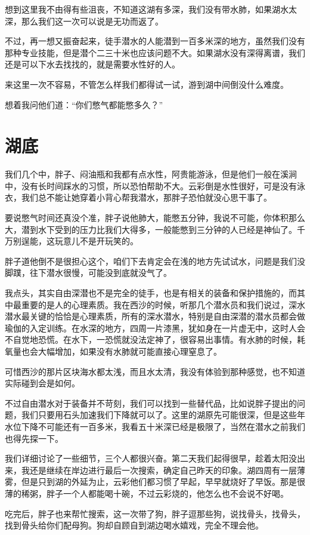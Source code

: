 想到这里我不由得有些沮丧，不知道这湖有多深，我们没有带水肺，如果湖水太深，那么我们这一次可以说是无功而返了。

不过，再一想又振奋起来，徒手潜水的人能潜到一百多米深的地方，虽然我们没有那种专业技能，但是潜个二三十米也应该问题不大。如果湖水没有深得离谱，我们还是可以下水去找找的，就是需要水性好的人。

来这里一次不容易，不管怎么样我们都得试一试，游到湖中间倒没什么难度。

想着我问他们道：“你们憋气都能憋多久？”

\chapter{湖底}

我们几个中，胖子、闷油瓶和我都有点水性，阿贵能游泳，但是他们一般在溪涧中，没有长时间踩水的习惯，所以恐怕帮助不大。云彩倒是水性很好，可是没有泳衣，我们总不能让她穿着小背心帮我潜水，那胖子恐怕就没心思干事了。

要说憋气时间还真没个准，胖子说他肺大，能憋五分钟，我说不可能，你体积那么大，潜到水下受到的压力比我们大得多，一般能憋到三分钟的人已经是神仙了。千万别逞能，这玩意儿不是开玩笑的。

胖子道他倒不是很担心这个，咱们下去肯定会在浅的地方先试试水，问题是我们没脚蹼，往下潜水很慢，可能没到底就没气了。

我点头，其实自由深潜也不是完全的徒手，也是有相关的装备和保护措施的，而其中最重要的是人的心理素质。我在西沙的时候，听那几个潜水员和我们说过，深水潜水最关键的恰恰是心理素质，所有的深水潜水，特别是自由深潜的潜水员都会做瑜伽的入定训练。在水深的地方，四周一片漆黑，犹如身在一片虚无中，这时人会不自觉地恐慌。在水下，一恐慌就没法定神了，很容易出事情。有水肺的时候，耗氧量也会大幅增加，如果没有水肺就可能直接心理窒息了。

可惜西沙的那片区块海水都太浅，而且水太清，我没有体验到那种感觉，也不知道实际碰到会是如何。

不过自由潜水对于装备并不苛刻，我们可以找到一些替代品，比如说胖子提出的问题，我们只要用石头加速我们下降就可以了。这里的湖原先可能很深，但是这些年水位下降不可能还有一百多米，我看五十米深已经是极限了，当然在潜水之前我们也得先探一下。

我们详细讨论了一些细节，三个人都很兴奋。第二天我们起得很早，趁着太阳没出来，我还是继续在岸边进行最后一次搜索，确定自己昨天的印象。湖四周有一层薄雾，但是只到湖的外延为止，云彩他们都习惯了早起，早早就烧好了早饭。那是很薄的稀粥，胖子一个人都能喝十碗，不过云彩烧的，他怎么也不会说不好喝。

吃完后，胖子也来帮忙搜索，这一次带了狗，胖子逗那些狗，说找骨头，找骨头，找到骨头给你们配母狗。狗却自顾自到湖边喝水嬉戏，完全不理会他。

